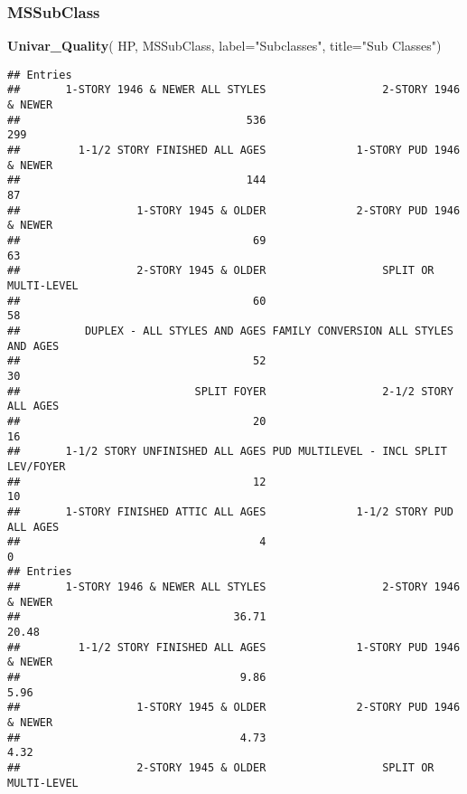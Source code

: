 \documentclass[
]{article}
\newenvironment{Shaded}{\begin{snugshade}}{\end{snugshade}}
\newcommand{\AttributeTok}[1]{\textcolor[rgb]{0.13,0.29,0.53}{#1}}
\newcommand{\FunctionTok}[1]{\textcolor[rgb]{0.13,0.29,0.53}{\textbf{#1}}}
\newcommand{\NormalTok}[1]{#1}
\newcommand{\StringTok}[1]{\textcolor[rgb]{0.31,0.60,0.02}{#1}}
\begin{document}
\subsubsection{MSSubClass}\label{mssubclass}

\begin{Shaded}
\begin{Highlighting}[]
\FunctionTok{Univar\_Quality}\NormalTok{(}
\NormalTok{  HP, MSSubClass,}
  \AttributeTok{label=}\StringTok{"Subclasses"}\NormalTok{,}
  \AttributeTok{title=}\StringTok{"Sub Classes"}\NormalTok{)}
\end{Highlighting}
\end{Shaded}

\begin{verbatim}
## Entries
##       1-STORY 1946 & NEWER ALL STYLES                  2-STORY 1946 & NEWER 
##                                   536                                   299 
##         1-1/2 STORY FINISHED ALL AGES              1-STORY PUD 1946 & NEWER 
##                                   144                                    87 
##                  1-STORY 1945 & OLDER              2-STORY PUD 1946 & NEWER 
##                                    69                                    63 
##                  2-STORY 1945 & OLDER                  SPLIT OR MULTI-LEVEL 
##                                    60                                    58 
##          DUPLEX - ALL STYLES AND AGES FAMILY CONVERSION ALL STYLES AND AGES 
##                                    52                                    30 
##                           SPLIT FOYER                  2-1/2 STORY ALL AGES 
##                                    20                                    16 
##       1-1/2 STORY UNFINISHED ALL AGES PUD MULTILEVEL - INCL SPLIT LEV/FOYER 
##                                    12                                    10 
##       1-STORY FINISHED ATTIC ALL AGES              1-1/2 STORY PUD ALL AGES 
##                                     4                                     0 
## Entries
##       1-STORY 1946 & NEWER ALL STYLES                  2-STORY 1946 & NEWER 
##                                 36.71                                 20.48 
##         1-1/2 STORY FINISHED ALL AGES              1-STORY PUD 1946 & NEWER 
##                                  9.86                                  5.96 
##                  1-STORY 1945 & OLDER              2-STORY PUD 1946 & NEWER 
##                                  4.73                                  4.32 
##                  2-STORY 1945 & OLDER                  SPLIT OR MULTI-LEVEL 

\end{verbatim}
\end{document}
